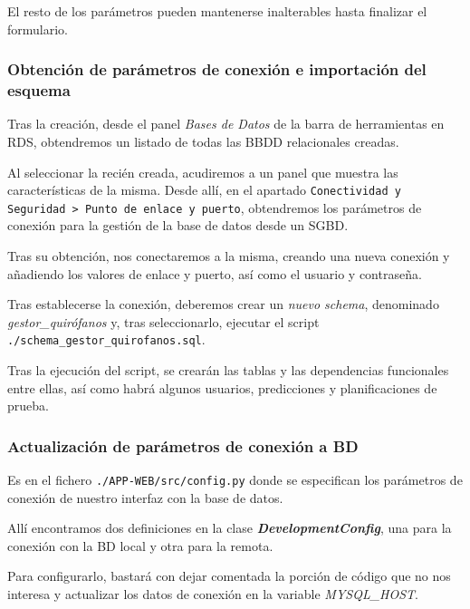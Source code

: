 El resto de los parámetros pueden mantenerse inalterables hasta finalizar el formulario.

\subsubsection{Obtención de parámetros de conexión e importación del esquema}

Tras la creación, desde el panel \textit{Bases de Datos} de la barra de herramientas en RDS, obtendremos un listado de todas las BBDD relacionales creadas.

Al seleccionar la recién creada, acudiremos a un panel que muestra las características de la misma. Desde allí, en el apartado \texttt{Conectividad y Seguridad > Punto de enlace y puerto}, obtendremos los parámetros de conexión para la gestión de la base de datos desde un SGBD.


Tras su obtención, nos conectaremos a la misma, creando una nueva conexión y añadiendo los valores de enlace y puerto, así como el usuario y contraseña.


Tras establecerse la conexión, deberemos crear un \textit{nuevo schema}, denominado \textit{gestor\_quirófanos} y, tras seleccionarlo, ejecutar el script \texttt{./schema\_gestor\_quirofanos.sql}.

Tras la ejecución del script, se crearán las tablas y las dependencias funcionales entre ellas, así como habrá algunos usuarios, predicciones y planificaciones de prueba.


\subsubsection{Actualización de parámetros de conexión a BD}

Es en el fichero \texttt{./APP-WEB/src/config.py} donde se especifican los parámetros de conexión de nuestro interfaz con la base de datos.

Allí encontramos dos definiciones en la clase \textbf{\textit{DevelopmentConfig}}, una para la conexión con la BD local y otra para la remota.

Para configurarlo, bastará con dejar comentada la porción de código que no nos interesa y actualizar los datos de conexión en la variable \textit{MYSQL\_HOST}.

